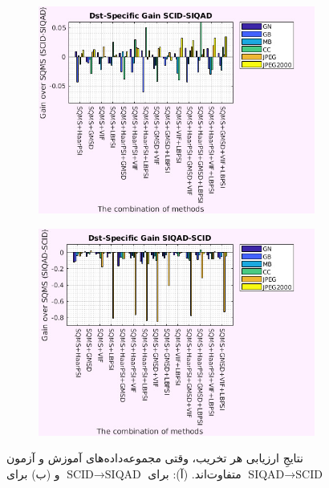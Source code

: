 \documentclass[twocolumn]{article}
\begin{document}
\begin{figure}
	\begin{subfigure}{0.47\textwidth}
		\includegraphics[width=\textwidth]{cross_SCID_SIQAD_dst}
		\caption{}
		\label{fig:scid_siqad_dst}
	\end{subfigure} 
	\hfill
	\begin{subfigure}{0.47\textwidth}
		\includegraphics[width=\textwidth]{cross_SIQAD_SCID_dst}
		\caption{}
		\label{fig:siqad_scid_dst}
	\end{subfigure}
	\caption{نتایجِ ارزیابی هر تخریب، وقتی مجموعه‌داده‌های آموزش و آزمون متفاوت‌اند. (آ): برای $\text{SCID}\rightarrow \text{SIQAD}$ و (ب) برای $\text{SIQAD}\rightarrow \text{SCID}$}
	\label{fig:cross_dst}
\end{figure}
\end{document}
